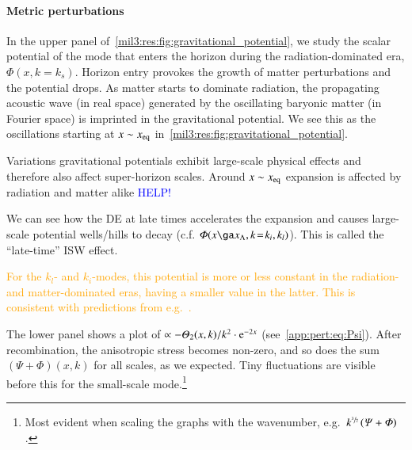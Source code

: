 \paragraph{Metric perturbations}
In the upper panel of~\cref{mil3:res:fig:gravitational_potential}, we study the scalar potential of the mode that enters the horizon during the radiation-dominated era, $\Phi(x,k\!=\!k_s)$. Horizon entry provokes the growth of matter perturbations and the potential drops. As matter starts to dominate radiation, the propagating acoustic wave (in real space) generated by the oscillating baryonic matter (in Fourier space) is imprinted in the gravitational potential. We see this as the oscillations starting at $x \sim x_\mathrm{eq}$ in~\cref{mil3:res:fig:gravitational_potential}.

Variations gravitational potentials exhibit large-scale physical effects and therefore also affect super-horizon scales. Around $x \sim x_\mathrm{eq}$ expansion is affected by radiation and matter alike \textcolor{blue}{HELP!}

We can see how the DE at late times accelerates the expansion and causes large-scale potential wells/hills to decay (c.f. $\Phi(x\ga x_\Lambda, k\!=\!k_i, k_l)$). This is called the ``late-time'' ISW effect.

\textcolor{orange}{
For the $k_l$- and $k_i$-modes, this potential is more or less constant in the radiation- and matter-dominated eras, having a smaller value in the latter. This is consistent with predictions from e.g.~\citet{Baumann}.
}

The lower panel shows a plot of $\propto -\Theta_2(x, k)/k^2\cdot \eu[-2x]$ (see~\cref{app:pert:eq:Psi}). After recombination, the anisotropic stress becomes non-zero, and so does the sum $\left(\Psi + \Phi\right)(x,k)$ for all scales, as we expected. Tiny fluctuations are visible before this for the small-scale mode.\footnote{Most evident when scaling the graphs with the wavenumber, e.g.~$k^{\sfrac{3}{2}} \left(\varPsi + \varPhi \right)$.}




